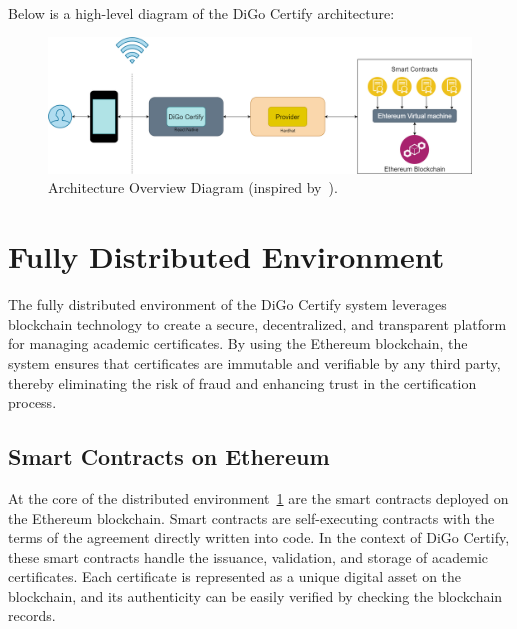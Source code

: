 \paragraph{}
Below is a high-level diagram of the DiGo Certify architecture:

\begin{figure}[H]
    \centering
    \includegraphics[width=1\textwidth]{../diagrams/architecture-overview.drawio.png}
    \caption{Architecture Overview Diagram (inspired by~\cite{geeksforgeeks-dApps}).}
    \label{fig:architecture-overview}
\end{figure}

\section{Fully Distributed Environment}\label{sec:fully-distributed-environment}

The fully distributed environment of the DiGo Certify system leverages blockchain technology to create a secure, decentralized, and transparent platform for managing academic certificates. By using the Ethereum blockchain, the system ensures that certificates are immutable and verifiable by any third party, thereby eliminating the risk of fraud and enhancing trust in the certification process.

\subsection{Smart Contracts on Ethereum}

At the core of the distributed environment~\ref{fig:architecture-overview} are the smart contracts deployed on the Ethereum blockchain. Smart contracts are self-executing contracts with the terms of the agreement directly written into code. In the context of DiGo Certify, these smart contracts handle the issuance, validation, and storage of academic certificates. Each certificate is represented as a unique digital asset on the blockchain, and its authenticity can be easily verified by checking the blockchain records.

